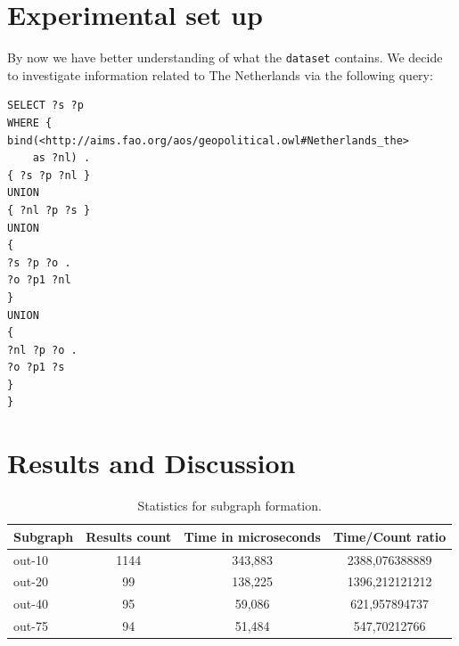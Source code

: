 \documentclass[runningheads,a4paper]{../../StyleFiles/llncs}
\begin{document}
\section{Experimental set up}
By now we have better understanding of what the \texttt{dataset} contains. We decide to investigate information related to The Netherlands via the following query:

\begin{lstlisting}[captionpos=b, caption=SPARQL query for calculating out degree of entities, label=lst:sparql, basicstyle=\ttfamily\small,frame=bt]
SELECT ?s ?p
WHERE {
bind(<http://aims.fao.org/aos/geopolitical.owl#Netherlands_the> 
	as ?nl) .
{ ?s ?p ?nl }
UNION
{ ?nl ?p ?s }
UNION
{
?s ?p ?o .
?o ?p1 ?nl
}
UNION
{
?nl ?p ?o .
?o ?p1 ?s
}
}
\end{lstlisting}

\section{Results and Discussion}
\begin{table}[h]
	\begin{center}
		\begin{tabular}{| l | c | c | c |}
			\hline
			\textbf{Subgraph} & \textbf{Results count} & \textbf{Time in microseconds} & \textbf{Time/Count ratio} \\ \hline
			out-10 & 1144 & 343,883 & 2388,076388889 \\ \hline
			out-20 & 99 & 138,225 & 1396,212121212 \\ \hline
			out-40 & 95 & 59,086 & 621,957894737 \\ \hline
			out-75 & 94 & 51,484 & 547,70212766 \\ \hline
		\end{tabular}
		\caption{Statistics for subgraph formation.}
		\label{subgraph_table}
	\end{center}
\end{table}
\end{document}
